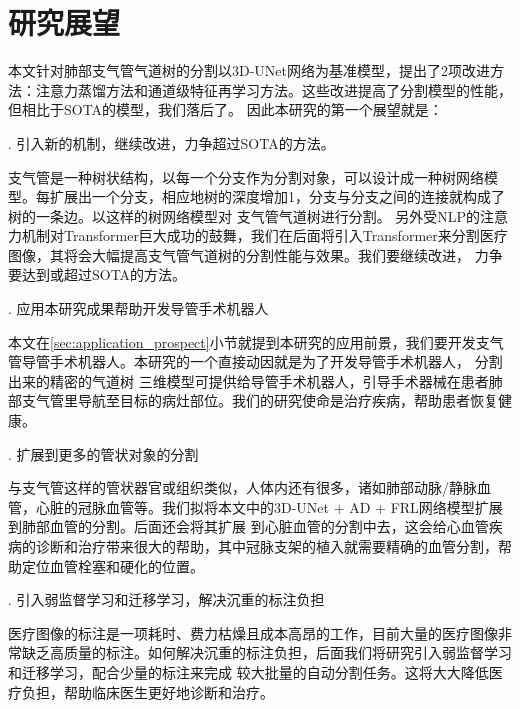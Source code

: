 \section{研究展望}

本文针对肺部支气管气道树的分割以3D-UNet网络为基准模型，提出了2项改进方法：注意力蒸馏方法和通道级特征再学习方法。这些改进提高了分割模型的性能，但相比于SOTA的模型，我们落后了。
因此本研究的第一个展望就是：

{. 引入新的机制，继续改进，力争超过SOTA的方法。} 

支气管是一种树状结构，以每一个分支作为分割对象，可以设计成一种树网络模型。每扩展出一个分支，相应地树的深度增加1，分支与分支之间的连接就构成了树的一条边。以这样的树网络模型对
支气管气道树进行分割。 另外受NLP的注意力机制对Transformer巨大成功的鼓舞，我们在后面将引入Transformer来分割医疗图像，其将会大幅提高支气管气道树的分割性能与效果。我们要继续改进，
力争要达到或超过SOTA的方法。

{. 应用本研究成果帮助开发导管手术机器人}

本文在\ref{sec:application_prospect}小节就提到本研究的应用前景，我们要开发支气管导管手术机器人。本研究的一个直接动因就是为了开发导管手术机器人， 分割出来的精密的气道树
三维模型可提供给导管手术机器人，引导手术器械在患者肺部支气管里导航至目标的病灶部位。我们的研究使命是治疗疾病，帮助患者恢复健康。

{. 扩展到更多的管状对象的分割}

与支气管这样的管状器官或组织类似，人体内还有很多，诸如肺部动脉/静脉血管，心脏的冠脉血管等。我们拟将本文中的3D-UNet + AD + FRL网络模型扩展到肺部血管的分割。后面还会将其扩展
到心脏血管的分割中去，这会给心血管疾病的诊断和治疗带来很大的帮助，其中冠脉支架的植入就需要精确的血管分割，帮助定位血管栓塞和硬化的位置。

{. 引入弱监督学习和迁移学习，解决沉重的标注负担}

医疗图像的标注是一项耗时、费力枯燥且成本高昂的工作，目前大量的医疗图像非常缺乏高质量的标注。如何解决沉重的标注负担，后面我们将研究引入弱监督学习和迁移学习，配合少量的标注来完成
较大批量的自动分割任务。这将大大降低医疗负担，帮助临床医生更好地诊断和治疗。